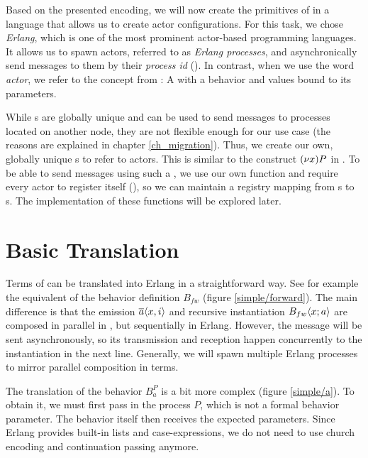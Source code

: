 Based on the presented encoding,
we will now create the primitives of \corejoincalc
in a language that allows us to create actor configurations.
For this task, we chose \emph{Erlang},
which is one of the most prominent actor-based programming languages.
It allows us to spawn actors, referred to as \emph{Erlang processes},
and asynchronically send messages to them by their \emph{process id} (\PID).
In contrast, when we use the word \emph{actor},
we refer to the concept from \actorpicalc:
A \actorname with a behavior and values bound to its parameters.

While \PID{}s are globally unique and can be used to send messages to
processes located on another node,
they are not flexible enough for our use case
(the reasons are explained in chapter \ref{ch_migration}).
Thus, we create our own, globally unique \actorname{}s to refer to actors.
This is similar to the construct $\anew{x}{P}$ in \actorpicalc.
To be able to send messages using such a \actorname,
we use our own  function and require every actor to register itself
(),
so we can maintain a registry mapping from \actorname{}s to \PID{}s.
The implementation of these functions will be explored later.


\section{Basic Translation}

Terms of \actorpicalc can be translated into Erlang in a straightforward way.
See for example the equivalent of the behavior definition $B_{fw}$
(figure \ref{simple/forward}).
The main difference is that the emission $\overline{a}\langle x,i\rangle$
and recursive instantiation $B_{fw} \langle x ; a \rangle$
are composed in parallel in \actorpicalc,
but sequentially in Erlang.
However, the message will be sent asynchronously,
so its transmission and reception happen concurrently to the instantiation
in the next line.
Generally, we will spawn multiple Erlang processes to
mirror parallel composition in \actorpicalc terms.


The translation of the behavior $B_a^P$ is a bit more complex
(figure \ref{simple/a}).
To obtain it, we must first pass in the process $P$,
which is not a formal behavior parameter.
The behavior itself then receives the expected parameters.
Since Erlang provides built-in lists and case-expressions,
we do not need to use church encoding and continuation passing anymore.

